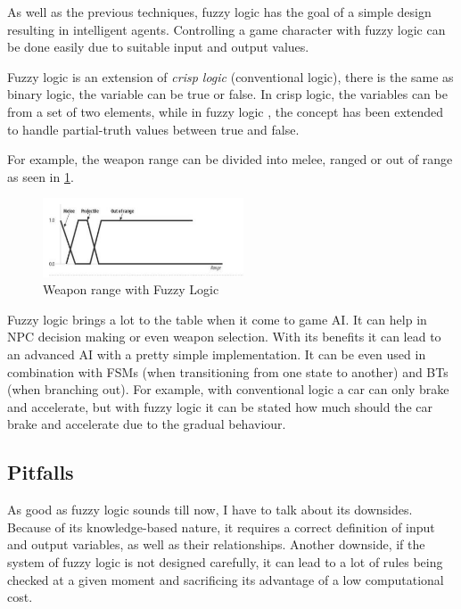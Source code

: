\documentclass[a4paper, 12pt]{book}
\begin{document}
As well as the previous techniques, fuzzy logic has the goal of a simple design resulting in intelligent agents. Controlling a game character with fuzzy logic can be done easily due to suitable input and output values.

Fuzzy logic is an extension of \emph{crisp logic} (conventional logic), there is the same as binary logic, the variable can be true or false. In crisp logic, the variables can be from a set of two elements, while in fuzzy logic \cite{FuzzyLogicBasedGameSystem}, the concept has been extended to handle partial-truth values between true and false. 

For example, the weapon range can be divided into melee, ranged or out of range as seen in \ref{pic4}.

\begin{figure}[h]
\begin{center}
\includegraphics[width=0.53\textwidth]{Images/weapon_range.png}
\end{center}
\caption{Weapon range with Fuzzy Logic}
\label{pic4}
\end{figure}

Fuzzy logic brings a lot to the table when it come to game AI. It can help in NPC decision making or even weapon selection. With its benefits it can lead to an advanced AI with a pretty simple implementation. It can be even used in combination with FSMs (when transitioning from one state to another) and BTs (when branching out). For example, with conventional logic a car can only brake and accelerate, but with fuzzy logic it can be stated how much should the car brake and accelerate due to the gradual behaviour. 

\subsection{Pitfalls}

As good as fuzzy logic sounds till now, I have to talk about its downsides. Because of its knowledge-based nature, it requires a correct definition of input and output variables, as well as their relationships. Another downside, if the system of fuzzy logic is not designed carefully, it can lead to a lot of rules being checked at a given moment and sacrificing its advantage of a low computational cost.
\end{document}
